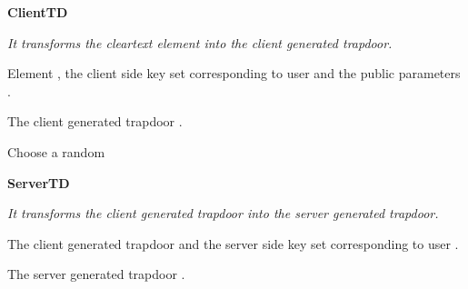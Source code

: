\documentclass[epsfig,a4paper,11pt,titlepage]{book}
\numberwithin{algorithm}{chapter}
\newcommand{\algofontsize}{\fontsize{11}{12}\selectfont}
\begin{document}
\begin{algorithm} [htp]
{\algofontsize
\caption{\textbf{ClientTD}}

\label{algo:erbac-client-td}

\begin{algorithmic}[1]

\INPUT \emph{It transforms the cleartext element into the client generated trapdoor.}

\Require Element , the client side key set  corresponding to user  and the public parameters .

\Ensure The client generated trapdoor .

\medskip

\State Choose a random  \label{line:erbac-c-td-choose}
\State  \label{line:erbac-c-td-sigma}
\State  \label{line:erbac-c-td-t1}
\State  \label{line:erbac-c-td-t2}

\State  \label{line:erbac-c-td-td}

\Return 

\end{algorithmic}
}
\end{algorithm}





\begin{algorithm} [htp]
{\algofontsize
\caption{\textbf{ServerTD}}

\label{algo:erbac-server-td}

\begin{algorithmic}[1]

\INPUT \emph{It transforms the client generated trapdoor into the server generated trapdoor.}

\Require The client generated trapdoor  and the server side key set  corresponding to user .

\Ensure The server generated trapdoor .

\medskip

\State  \label{line:erbac-s-td-calculate}

\Return 

\end{algorithmic}
}
\end{algorithm}
\end{document}
